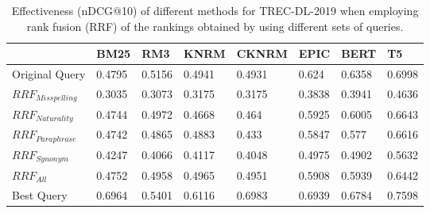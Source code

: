 \begin{table}[ht]
\centering
\caption{Effectiveness (nDCG@10) of different methods for TREC-DL-2019 when employing rank fusion (RRF) of the rankings obtained by using different sets of queries.}
\label{tab:trec-fusion-table}
\begin{tabularx}{\columnwidth}{l|X|X|X|X|X|X|X}

\textbf{} & \textbf{\textbf{BM25}} & \textbf{\textbf{RM3}} & \textbf{KNRM} & \textbf{CKNRM} & \textbf{EPIC} & \textbf{BERT} & \textbf{T5} \\ \hline
Original Query   & 0.4795 & 0.5156 & 0.4941 & 0.4931 & 0.624  & 0.6358 & 0.6998 \\ \hline
$RRF_{Misspelling}$ & 0.3035 & 0.3073 & 0.3175 & 0.3175 & 0.3838 & 0.3941 & 0.4636 \\
$RRF_{Naturality}$  & 0.4744 & 0.4972 & 0.4668 & 0.464  & 0.5925 & 0.6005 & 0.6643 \\
$RRF_{Paraphrase}$  & 0.4742 & 0.4865 & 0.4883 & 0.433  & 0.5847 & 0.577  & 0.6616 \\
$RRF_{Synonym}$     & 0.4247 & 0.4066 & 0.4117 & 0.4048 & 0.4975 & 0.4902 & 0.5632 \\
$RRF_{All}$         & 0.4752 & 0.4958 & 0.4965 & 0.4951 & 0.5908 & 0.5939 & 0.6442 \\ \hline
Best Query       & 0.6964 & 0.5401 & 0.6116 & 0.6983 & 0.6939 & 0.6784 & 0.7598
\end{tabularx}
\end{table}
